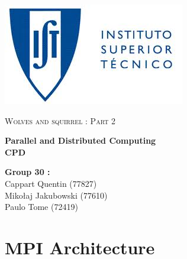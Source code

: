 \documentclass[a4paper,10pt]{article}
\begin{document}
\begin{flushleft}
\includegraphics[scale=0.3]{logo_ist.jpeg}
\end{flushleft}


\vspace{1cm}

\begin{center}{
\scshape{\LARGE Wolves and squirrel : Part 2 }}

\vspace{0.5cm}
\hbox{}
{\setlength{\parskip}{0.2cm}

 \Huge
 \bfseries
 \LARGE  Parallel and Distributed Computing
 \\
CPD \\

\vspace{0.2cm}

}
\vspace{0.5cm}

\hbox{}
\vspace{2.5cm}


\end{center}

\vspace{3cm}


\vfill
\begin{flushright}
\textbf{Group 30 :}\\
Cappart Quentin (77827)\\
Mikołaj Jakubowski (77610)\\
Paulo Tome (72419)\\

\end{flushright}
\newpage

\setcounter{page}{1}

\renewcommand\thepage{\arabic{page}}


\newpage

\section*{MPI Architecture}
\end{document}

